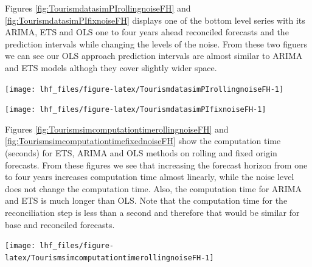 \documentclass[11pt,a4paper,]{article}
\let\origfigure\figure
\let\endorigfigure\endfigure
\renewenvironment{figure}[1][2] {
    \expandafter\origfigure\expandafter[!htbp]
} {
    \endorigfigure
}
\begin{document}
Figures \ref{fig:TourismdatasimPIrollingnoiseFH} and \ref{fig:TourismdatasimPIfixnoiseFH} displays one of the bottom level series with its ARIMA, ETS and OLS one to four years ahead reconciled forecasts and the prediction intervals while changing the levels of the noise. From these two figuers we can see our OLS approach prediction intervals are almost similar to ARIMA and ETS models althogh they cover slightly wider space.

\begin{figure}

{\centering \texttt{[image: lhf\_files/figure-latex/TourismdatasimPIrollingnoiseFH-1]} 

}

\caption{The actual test set for one of the bottom level series with different error levels forecasted with ETS, ARIMA and OLS with reconciliation and prediction intervals in one to four years- Rolling origin - 304 bottom level series and 8 levels of hierarchy - Simulated tourism dataset}\label{fig:TourismdatasimPIrollingnoiseFH}
\end{figure}

\begin{figure}

{\centering \texttt{[image: lhf\_files/figure-latex/TourismdatasimPIfixnoiseFH-1]} 

}

\caption{The actual test set for one of the bottom level series with different error levels forecasted with ETS, ARIMA and OLS with reconciliation and prediction intervals in one to four years- Fixed origin - 304 bottom level series and 8 levels of hierarchy - Simulated tourism dataset}\label{fig:TourismdatasimPIfixnoiseFH}
\end{figure}

Figures \ref{fig:TourismsimcomputationtimerollingnoiseFH} and \ref{fig:TourismsimcomputationtimefixednoiseFH} show the computation time (seconds) for ETS, ARIMA and OLS methods on rolling and fixed origin forecasts. From these figures we see that increasing the forecast horizon from one to four years increases computation time almost linearly, while the noise level does not change the computation time. Also, the computation time for ARIMA and ETS is much longer than OLS. Note that the computation time for the reconciliation step is less than a second and therefore that would be similar for base and reconciled forecasts.

\begin{figure}

{\centering \texttt{[image: lhf\_files/figure-latex/TourismsimcomputationtimerollingnoiseFH-1]} 

}

\caption{Computation time (seconds) for ETS, ARIMA and OLS with and without reconciliation - Rolling  origin forecasts on one to four year test set and different error values - 304 bottom level series and 8 levels of hierarchy - Simulated tourism dataset.}\label{fig:TourismsimcomputationtimerollingnoiseFH}
\end{figure}
\end{document}
